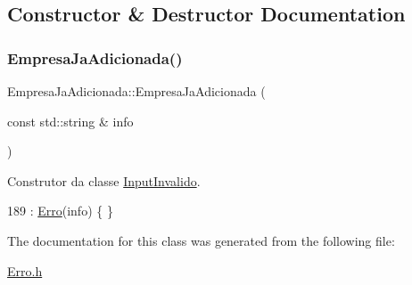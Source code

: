 \subsection{Constructor \& Destructor Documentation}
\mbox{\label{classEmpresaJaAdicionada_a31a58cd9fd890fc30edd073a560b1a6e}} 
\subsubsection{\texorpdfstring{Empresa\+Ja\+Adicionada()}{EmpresaJaAdicionada()}}
{\footnotesize\ttfamily Empresa\+Ja\+Adicionada\+::\+Empresa\+Ja\+Adicionada (\begin{DoxyParamCaption}\item[{const std\+::string \&}]{info }\end{DoxyParamCaption})\hspace{0.3cm}{\ttfamily [inline]}}



Construtor da classe \hyperlink{classInputInvalido}{Input\+Invalido}. 


\begin{DoxyCode}
189 : \hyperlink{classErro_a15d79796bd17517ff05d45eee55556f1}{Erro}(info) \{ \}
\end{DoxyCode}


The documentation for this class was generated from the following file\+:\begin{DoxyCompactItemize}
\item 
\hyperlink{Erro_8h}{Erro.\+h}\end{DoxyCompactItemize}
